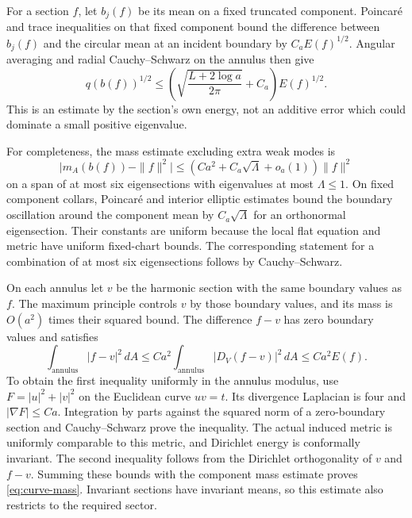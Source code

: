 For a section $f$, let $b_j(f)$ be its mean on a fixed truncated
component. Poincar\'e and trace inequalities on that fixed component
bound the difference between $b_j(f)$ and the circular mean at an
incident boundary by $C_aE(f)^{1/2}$. Angular averaging and radial
Cauchy--Schwarz on the annulus then give
\begin{equation}\label{eq:curve-lower}
 q(b(f))^{1/2}
 \le\left(\sqrt{\frac{L+2\log a}{2\pi}}+C_a\right)E(f)^{1/2}.
\end{equation}
This is an estimate by the section's own energy, not an additive error
which could dominate a small positive eigenvalue.

For completeness, the mass estimate excluding extra weak modes is
\begin{equation}\label{eq:curve-mass}
 \bigl|m_A(b(f))-\|f\|^2\bigr|
 \le(Ca^2+C_a\sqrt\Lambda+o_a(1))\|f\|^2
\end{equation}
on a span of at most six eigensections with eigenvalues at most
$\Lambda\le1$. On fixed component collars, Poincar\'e and interior
elliptic estimates bound the boundary oscillation around the component
mean by $C_a\sqrt\Lambda$ for an orthonormal eigensection. Their
constants are uniform because the local flat equation and metric have
uniform fixed-chart bounds. The corresponding statement for a combination
of at most six eigensections follows by Cauchy--Schwarz.

On each annulus let $v$ be the harmonic section with the same boundary
values as $f$. The maximum principle controls $v$ by those boundary
values, and its mass is $O(a^2)$ times their squared bound.
The difference $f-v$ has zero boundary values and satisfies
\[
 \int_{\text{annulus}}|f-v|^2\,dA
       \le Ca^2\int_{\text{annulus}}|D_V(f-v)|^2\,dA
       \le Ca^2E(f).
\]
To obtain the first inequality uniformly in the annulus modulus,
use $F=|u|^2+|v|^2$ on the Euclidean curve $uv=t$.
Its divergence Laplacian is four and $|\nabla F|\le Ca$.
Integration by parts against the squared norm of a zero-boundary
section and Cauchy--Schwarz prove the inequality. The actual induced
metric is uniformly comparable to this metric, and Dirichlet energy
is conformally invariant. The second inequality follows from the
Dirichlet orthogonality of $v$ and $f-v$. Summing these bounds with
the component mass estimate proves \eqref{eq:curve-mass}. Invariant
sections have invariant means, so this estimate also restricts to
the required sector.

